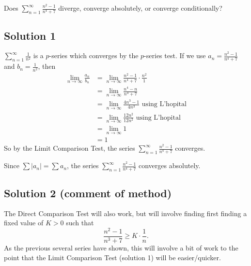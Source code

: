 \documentclass{article}
\begin{document}
\noindent
Does $\displaystyle \sum_{n=1}^\infty \frac{n^2-1}{n^4+7}$
diverge, converge absolutely, or converge conditionally?

\subsection*{Solution 1}

$\displaystyle \sum_{n=1}^\infty \frac1{n^2}$ is a $p$-series which converges by the $p$-series test. If we use $a_n = \frac{n^2-1}{n^4+7}$ and $b_n = \frac1{n^2}$, then
\begin{align*}
\lim_{n \to \infty} \frac{a_n}{b_n}
&= \lim_{n \to \infty} \frac{n^2-1}{n^4+7} \cdot \frac{n^2}{1}\\
&= \lim_{n \to \infty} \frac{n^4-n}{n^4+7} \\
&= \lim_{n \to \infty} \frac{4n^3-1}{4n^3} \text{ using L'hopital}\\
&= \lim_{n \to \infty} \frac{12n^2}{12n^2} \text{ using L'hopital}\\
&= \lim_{n \to \infty} 1\\
&= 1
\end{align*}
So by the Limit Comparison Test, the series $\displaystyle \sum_{n=1}^\infty \frac{n^2-1}{n^4+7}$ converges.

Since $\sum |a_n| = \sum a_n$, the series $\displaystyle \sum_{n=1}^\infty \frac{n^2-1}{n^4+7}$ converges absolutely.

\subsection*{Solution 2 (comment of method)}

The Direct Comparison Test will also work, but will involve finding first finding a fixed value of $K > 0$ such that
\[ \frac{n^2-1}{n^3+7} \geq K \cdot \frac1n.\]
As the previous several series have shown, this will involve a bit of work to the point that the Limit Comparison Test (solution 1) will be easier/quicker.
\end{document}
